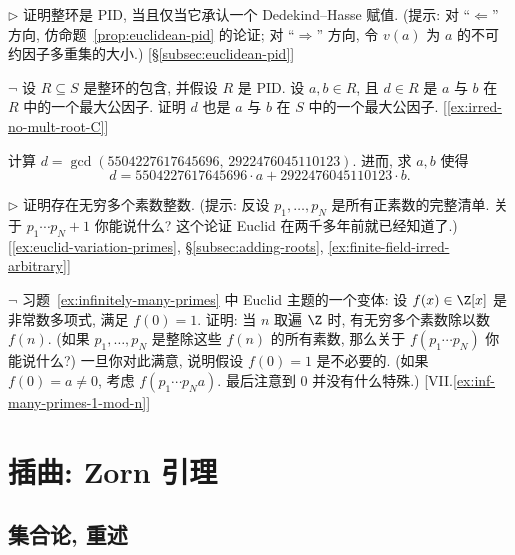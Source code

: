 \begin{prob}
\label{ex:dedekind-hasse-pid}
$\triangleright$ 证明整环是 PID, 当且仅当它承认一个 Dedekind--Hasse 赋值. (提示: 对 ``$\Leftarrow$'' 方向, 仿命题~\ref{prop:euclidean-pid} 的论证; 对 ``$\Rightarrow$'' 方向, 令 $v(a)$ 为 $a$ 的不可约因子多重集的大小.) [§\ref{subsec:euclidean-pid}]
\end{prob}
\begin{prob}
\label{ex:pid-gcd-in-extension}
$\neg$ 设 $R\subseteq S$ 是整环的包含, 并假设 $R$ 是 PID. 设 $a,b\in R$, 且 $d\in R$ 是 $a$ 与 $b$ 在 $R$ 中的一个最大公因子. 证明 $d$ 也是 $a$ 与 $b$ 在 $S$ 中的一个最大公因子. [\ref{ex:irred-no-mult-root-C}]
\end{prob}

\begin{prob}
\label{ex:gcd-big-numbers}
计算 $d = \gcd(5504227617645696,\, 2922476045110123)$. 进而, 求 $a,b$ 使得
\[
d = 5504227617645696\cdot a + 2922476045110123\cdot b.
\]
\end{prob}

\begin{prob}
\label{ex:infinitely-many-primes}
$\triangleright$ 证明存在无穷多个素数整数. (提示: 反设 $p_1,\dots,p_N$ 是所有正素数的完整清单. 关于 $p_1\cdots p_N+1$ 你能说什么? 这个论证 Euclid 在两千多年前就已经知道了.) [\ref{ex:euclid-variation-primes}, §\ref{subsec:adding-roots}, \ref{ex:finite-field-irred-arbitrary}]
\end{prob}

\begin{prob}
\label{ex:euclid-variation-primes}
$\neg$ 习题~\ref{ex:infinitely-many-primes} 中 Euclid 主题的一个变体: 设 $f(x)\in \Z[x]$ 是非常数多项式, 满足 $f(0)=1$. 证明: 当 $n$ 取遍 $\Z$ 时, 有无穷多个素数除以数 $f(n)$. (如果 $p_1,\dots,p_N$ 是整除这些 $f(n)$ 的所有素数, 那么关于 $f(p_1\cdots p_N)$ 你能说什么?) 一旦你对此满意, 说明假设 $f(0)=1$ 是不必要的. (如果 $f(0)=a\neq 0$, 考虑 $f(p_1\cdots p_N a)$. 最后注意到 $0$ 并没有什么特殊.) [VII.\ref{ex:inf-many-primes-1-mod-n}]
\end{prob}
\section{插曲: Zorn 引理}
\label{sec:zorn-lemma}

\subsection{集合论, 重述}
\label{subsec:set-theory-reprise}

